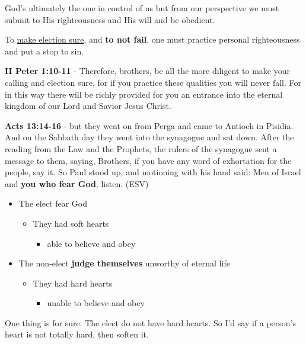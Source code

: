 \documentclass[11pt]{article}
\begin{document}
God's ultimately the one in control of us but from our perspective we must submit to His righteousness and His will and be obedient.

To \uline{make election sure}, and \textbf{to not fail}, one must practice personal righteousness and put a stop to sin.

\textbf{II Peter 1:10-11} - Therefore, brothers, be all the more diligent to make your calling and election sure, for if you practice these qualities you will never fall. For in this way there will be richly provided for you an entrance into the eternal kingdom of our Lord and Savior Jesus Christ.

\textbf{Acts 13:14-16} - but they went on from Perga and came to Antioch in Pisidia.  And on the Sabbath day they went into the synagogue and sat down.  After the reading from the Law and the Prophets, the rulers of the synagogue sent a message to them, saying, Brothers, if you have any word of exhortation for the people, say it.  So Paul stood up, and motioning with his hand said: Men of Israel and \textbf{you who fear God}, listen.  (ESV)

\begin{itemize}
\item The elect fear God
\begin{itemize}
\item They had soft hearts
\begin{itemize}
\item able to believe and obey
\end{itemize}
\end{itemize}
\item The non-elect \textbf{judge themselves} unworthy of eternal life
\begin{itemize}
\item They had hard hearts
\begin{itemize}
\item unable to believe and obey
\end{itemize}
\end{itemize}
\end{itemize}

One thing is for sure. The elect do not have hard hearts.
So I'd say if a person's heart is not totally hard, then soften it.
\end{document}

